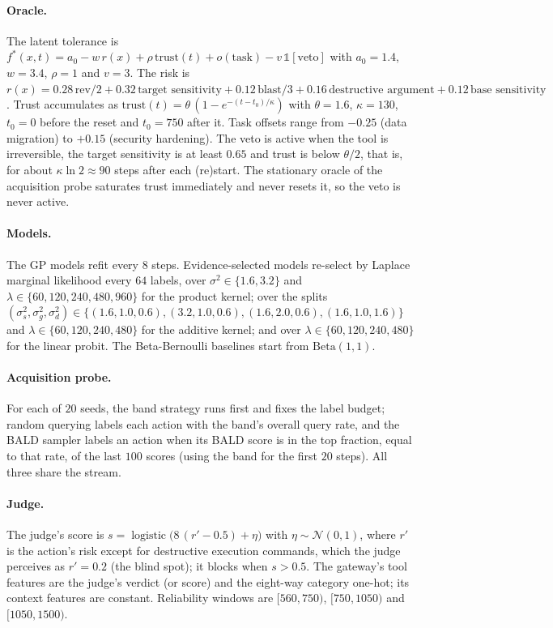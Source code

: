\documentclass[11pt]{article}
\begin{document}
\paragraph{Oracle.} The latent tolerance is
$f^*(x,t) = a_0 - w\,r(x) + \rho\,\mathrm{trust}(t) + o(\text{task}) -
v\,\mathbb 1[\text{veto}]$ with $a_0 = 1.4$, $w = 3.4$, $\rho = 1$ and
$v = 3$. The risk is $r(x) = 0.28\,\text{rev}/2 + 0.32\,\text{target
sensitivity} + 0.12\,\text{blast}/3 + 0.16\,\text{destructive argument} +
0.12\,\text{base sensitivity}$. Trust accumulates as
$\mathrm{trust}(t) = \theta\,(1 - e^{-(t - t_0)/\kappa})$ with $\theta = 1.6$,
$\kappa = 130$, $t_0 = 0$ before the reset and $t_0 = 750$ after it. Task
offsets range from $-0.25$ (data migration) to $+0.15$ (security hardening).
The veto is active when the tool is irreversible, the target sensitivity is at
least $0.65$ and trust is below $\theta/2$, that is, for about
$\kappa \ln 2 \approx 90$ steps after each (re)start. The stationary oracle of
the acquisition probe saturates trust immediately and never resets it, so the
veto is never active.

\paragraph{Models.} The GP models refit every $8$ steps. Evidence-selected
models re-select by Laplace marginal likelihood every $64$ labels, over
$\sigma^2 \in \{1.6, 3.2\}$ and $\lambda \in \{60, 120, 240, 480, 960\}$ for the
product kernel; over the splits $(\sigma_s^2, \sigma_g^2, \sigma_d^2) \in
\{(1.6, 1.0, 0.6), (3.2, 1.0, 0.6), (1.6, 2.0, 0.6), (1.6, 1.0, 1.6)\}$ and
$\lambda \in \{60, 120, 240, 480\}$ for the additive kernel; and over
$\lambda \in \{60, 120, 240, 480\}$ for the linear probit. The Beta-Bernoulli
baselines start from $\mathrm{Beta}(1,1)$.

\paragraph{Acquisition probe.} For each of $20$ seeds, the band strategy runs
first and fixes the label budget; random querying labels each action with the
band's overall query rate, and the BALD sampler labels an action when its
BALD score is in the top fraction, equal to that rate, of the last $100$
scores (using the band for the first $20$ steps). All three share the stream.

\paragraph{Judge.} The judge's score is
$s = \operatorname{logistic}\bigl(8\,(r' - 0.5) + \eta\bigr)$ with
$\eta \sim \mathcal N(0, 1)$, where $r'$ is the action's risk except for
destructive execution commands, which the judge perceives as $r' = 0.2$
(the blind spot); it blocks when $s > 0.5$. The gateway's tool features are
the judge's verdict (or score) and the eight-way category one-hot; its
context features are constant. Reliability windows are
$[560, 750)$, $[750, 1050)$ and $[1050, 1500)$.
\end{document}
